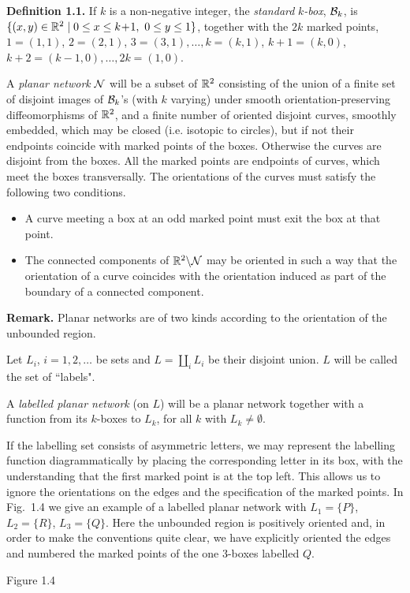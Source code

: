   
\bs\bs
{}

\medskip
{\bf Definition 1.1.} If $k$ is a non-negative integer, the
{\it standard} $k${\it -box}, ${\cal B} _k$, is
$\{ (x,y)\in\mathbb R^2\mid 0\leq x\leq k\!+\!1, \
0\leq y\leq 1\}$, together with the $2k$ marked points,
$1\!=\!(1,1)$, $2\!=\!(2,1)$, $3=(3,1),\dots ,k=(k,1)$,
$k+1=(k,0)$, \ $k+2=(k-1,0),\dots ,2k=(1,0)$.

A {\it planar network} $\cal N$ will be a subset of $\mathbb R^2$ consisting
of the union of a finite set of disjoint images of ${\cal B}_k$'s
(with $k$ varying) under smooth orientation-preserving
diffeomorphisms of $\mathbb R^2$, and a finite number of oriented disjoint
curves, smoothly embedded, which may be closed (i.e. isotopic to
circles), but if not their endpoints coincide with marked points of
the boxes. Otherwise the curves are disjoint from the boxes.
All the marked points are endpoints of curves, which meet the boxes
transversally. The orientations of the curves must satisfy the
following two conditions.
\begin{itemize}
\item[a)] A curve meeting a box at an odd marked point
must exit the box at that point.
\item[b)] The connected components of $\mathbb R^2\backslash\cal N$
may be oriented in such a way that the orientation of a curve
coincides with the orientation induced as part of the boundary of a
connected component.
\end{itemize}

{\bf Remark.} Planar networks are of two kinds according to the
orientation of the unbounded region.

\bs
Let $L_i$, $i=1,2,\dots$ be sets and $L=\coprod_i L_i$ be their
disjoint union. $L$ will be called the set of ``labels".

 A {\it labelled planar network}
(on $L$) will be a planar network together with a function from its
$k$-boxes to $L_k$, for all $k$ with $L_k\neq\emptyset$.

\bs If the labelling set consists of asymmetric letters, we may
represent the labelling function diagrammatically by placing the
corresponding letter in its box, with the understanding that the
first marked point is at the top left. This allows us to ignore the
orientations on the edges and the specification of the marked
points. In Fig.~1.4 we give an example of a labelled planar network
with $L_1=\{ P\}$, $L_2=\{ R\}$, $L_3=\{ Q\}$. Here the unbounded
region is positively oriented and, in order to make the conventions
quite clear, we have explicitly oriented the edges and numbered the
marked points of the one 3-boxes labelled $Q$.
\[
        
\]
\begin{center}
Figure 1.4
\end{center}

